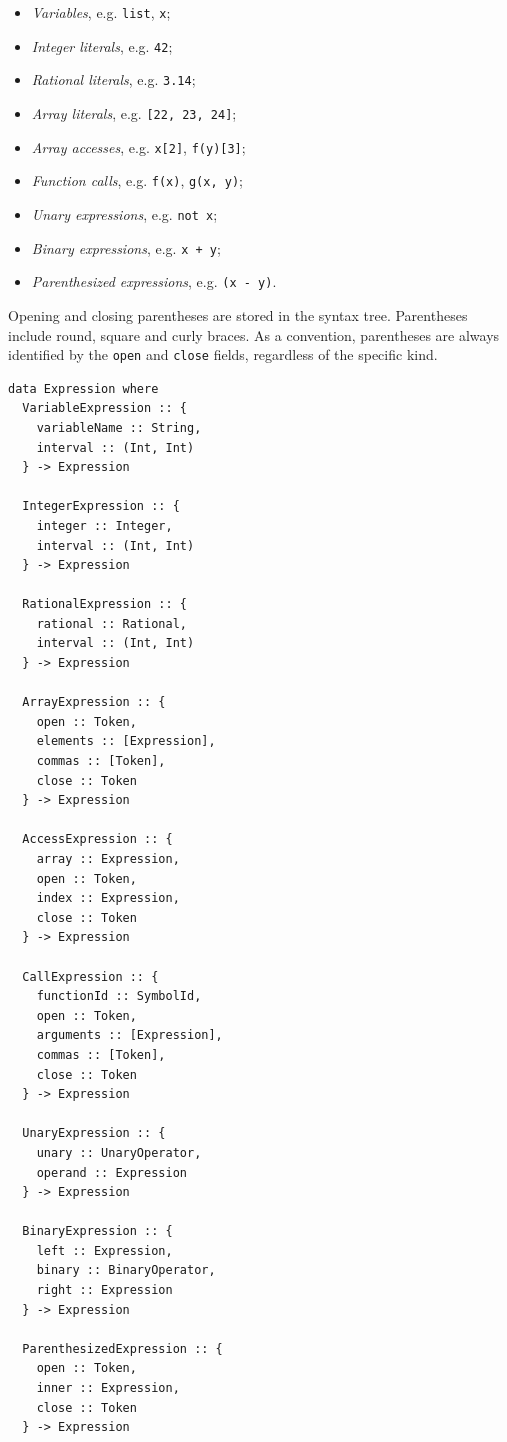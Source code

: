 \documentclass[11pt, american, draft]{PhdThesis}
\begin{document}
  \begin{itemize}[noitemsep,topsep=0pt]
    \item \emph{Variables}, e.g. \verb$list$, \verb$x$;
    \item \emph{Integer literals}, e.g. \verb$42$;
    \item \emph{Rational literals}, e.g. \verb$3.14$;
    \item \emph{Array literals}, e.g. \verb$[22, 23, 24]$;
    \item \emph{Array accesses}, e.g. \verb$x[2]$, \verb$f(y)[3]$;
    \item \emph{Function calls}, e.g. \verb$f(x)$, \verb$g(x, y)$;
    \item \emph{Unary expressions}, e.g. \verb$not x$;
    \item \emph{Binary expressions}, e.g. \verb$x + y$;
    \item \emph{Parenthesized expressions}, e.g. \verb$(x - y)$.
  \end{itemize}

  Opening and closing parentheses are stored in the syntax tree. Parentheses include round, square
  and curly braces. As a convention, parentheses are always identified by the \verb$open$ and
  \verb$close$ fields, regardless of the specific kind.

\begin{verbatim}
data Expression where
  VariableExpression :: {
    variableName :: String,
    interval :: (Int, Int)
  } -> Expression

  IntegerExpression :: {
    integer :: Integer,
    interval :: (Int, Int)
  } -> Expression

  RationalExpression :: {
    rational :: Rational,
    interval :: (Int, Int)
  } -> Expression

  ArrayExpression :: {
    open :: Token,
    elements :: [Expression],
    commas :: [Token],
    close :: Token
  } -> Expression

  AccessExpression :: {
    array :: Expression,
    open :: Token,
    index :: Expression,
    close :: Token
  } -> Expression

  CallExpression :: {
    functionId :: SymbolId,
    open :: Token,
    arguments :: [Expression],
    commas :: [Token],
    close :: Token
  } -> Expression

  UnaryExpression :: {
    unary :: UnaryOperator,
    operand :: Expression
  } -> Expression

  BinaryExpression :: {
    left :: Expression,
    binary :: BinaryOperator,
    right :: Expression
  } -> Expression

  ParenthesizedExpression :: {
    open :: Token,
    inner :: Expression,
    close :: Token
  } -> Expression
\end{verbatim}
\end{document}
